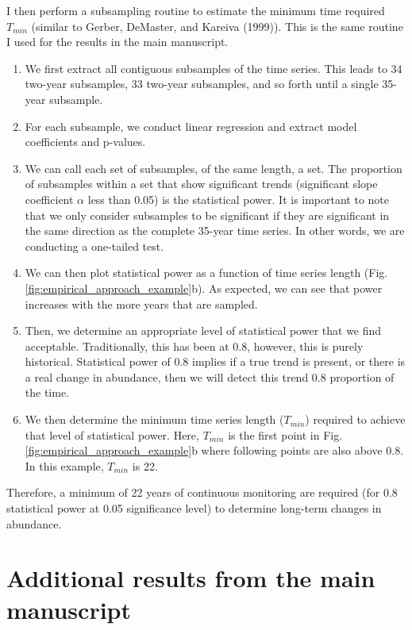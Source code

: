 \documentclass[12pt,]{article}
\begin{document}
I then perform a subsampling routine to estimate the minimum time
required \(T_{min}\) (similar to Gerber, DeMaster, and Kareiva (1999)).
This is the same routine I used for the results in the main manuscript.

\begin{enumerate}
  \item We first extract all contiguous subsamples of the time series. This leads to 34 two-year subsamples, 33 two-year subsamples, and so forth until a single 35-year subsample.  
  \item For each subsample, we conduct linear regression and extract model coefficients and p-values.    \item We can call each set of subsamples, of the same length, a set. The proportion of subsamples within a set that show significant trends (significant slope coefficient $\alpha$ less than 0.05) is the statistical power. It is important to note that we only consider subsamples to be significant if they are significant in the same direction as the complete 35-year time series. In other words, we are conducting a one-tailed test.
  \item We can then plot statistical power as a function of time series length (Fig. \ref{fig:empirical_approach_example}b). As expected, we can see that power increases with the more years that are sampled.
  \item  Then, we determine an appropriate level of statistical power that we find acceptable. Traditionally, this has been at 0.8, however, this is purely historical. Statistical power of 0.8 implies if a true trend is present, or there is a real change in abundance, then we will detect this trend 0.8 proportion of the time. 
  \item We then determine the minimum time series length ($T_{min}$) required to achieve that level of statistical power. Here, $T_{min}$ is the first point in Fig. \ref{fig:empirical_approach_example}b where following points are also above 0.8. In this example, $T_{min}$ is 22. 
\end{enumerate}

Therefore, a minimum of 22 years of continuous monitoring are required
(for 0.8 statistical power at 0.05 significance level) to determine
long-term changes in abundance.

\pagebreak

\section{Additional results from the main
manuscript}\label{additional-results-from-the-main-manuscript}
\end{document}
